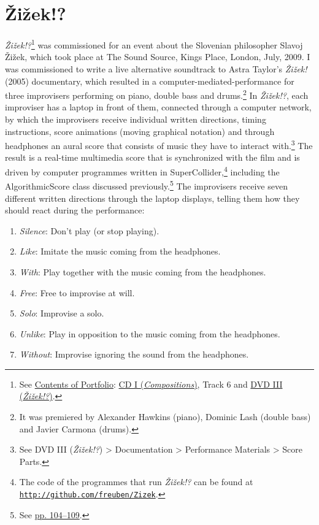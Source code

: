 \section{\v{Z}i\v{z}ek!?}

\emph{\v{Z}i\v{z}ek!?}\footnote{See \hyperlink{portfolio}{Contents of Portfolio}: \href{http://www.federicoreuben.com/phd/?page_id=26}{CD I (\emph{Compositions})}, Track 6 and \href{http://www.federicoreuben.com/phd/zizek}{DVD III (\emph{\v{Z}i\v{z}ek!?})}.} was commissioned for an event about the Slovenian philosopher Slavoj \v{Z}i\v{z}ek, which took place at The Sound Source, Kings Place, London, July, 2009. I was commissioned to write a live alternative soundtrack to Astra Taylor's \emph{\v{Z}i\v{z}ek!} (2005) documentary, which resulted in a \mbox{computer-mediated-performance} for three improvisers performing on piano, double bass and drums.\footnote{It was premiered by Alexander Hawkins (piano), Dominic Lash (double bass) and Javier Carmona (drums).} In \emph{\v{Z}i\v{z}ek!?}, each improviser has a laptop in front of them, connected through a computer network, by which the improvisers receive individual written directions, timing instructions, score animations (moving graphical notation) and through headphones an aural score that consists of music they have to interact with.\footnote{See DVD III (\emph{\v{Z}i\v{z}ek!?}) \tiny \textgreater \footnotesize \hspace{0pt} Documentation \tiny \textgreater \footnotesize \hspace{0pt} Performance Materials \tiny \textgreater \footnotesize \hspace{0pt} Score Parts.} The result is a real-time multimedia score that is synchronized with the film and is driven by computer programmes written in SuperCollider,\footnote{The code of the programmes that run \emph{\v{Z}i\v{z}ek!?} can be found at \href{http://github.com/freuben/Zizek}{\texttt {http://github.com/freuben/Zizek}}.} including the AlgorithmicScore class discussed previously.\footnote{See \hyperlink{algoscore}{pp. 104--109}.} The improvisers receive seven different written directions through the laptop displays, telling them how they should react during the performance:
\begin{enumerate}
\item \emph{Silence}: Don't play (or stop playing).
\item \emph{Like}: Imitate the music coming from the headphones.
\item \emph{With}: Play together with the music coming from the headphones.
\item \emph{Free}: Free to improvise at will.
\item \emph{Solo}: Improvise a solo.
\item \emph{Unlike}: Play in opposition to the music coming from the headphones. 
\item \emph{Without}: Improvise ignoring the sound from the headphones.
\end{enumerate}
